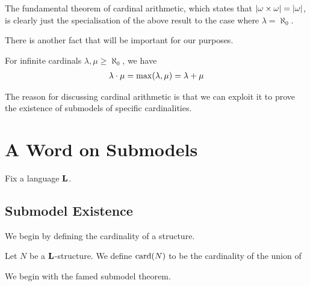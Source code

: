The fundamental theorem of cardinal arithmetic, which states that $\left\lvert \omega \times \omega \right\rvert = \left\lvert \omega \right\rvert$, is clearly just the specialisation of the above result to the case where $\lambda = \aleph_{0}$.

There is another fact that will be important for our purposes.

\begin{boxtheorem}
    For infinite cardinals $\lambda, \mu \geq \aleph_{0}$, we have
    \begin{align*}
        \lambda \cdot \mu = \max\!\left( \lambda, \mu \right) = \lambda + \mu
    \end{align*}
\end{boxtheorem}

The reason for discussing cardinal arithmetic is that we can exploit it to prove the existence of submodels of specific cardinalities.

\section{A Word on Submodels}

Fix a language $\mathbf{L}$.

\subsection{Submodel Existence}

We begin by defining the cardinality of a structure.

\begin{boxdefinition}
    Let $N$ be a $\mathbf{L}$-structure. We define $\operatorname{card}\!\left( N \right)$ to be the cardinality of the union of 
\end{boxdefinition}

We begin with the famed submodel theorem.

